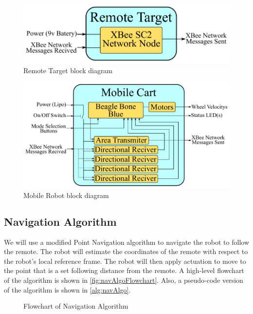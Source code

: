 \documentclass[letterpaper,12pt]{article}   %
\begin{document}
\begin{figure}[!h]
    \centering
    \includegraphics[scale=0.9]{figs/remote_target_block_diagram}
    \caption{Remote Target block diagram}
	\label{fig:remote_block_diag}
\end{figure}
\begin{figure}[!h]
    \centering
    \includegraphics[scale=0.82]{figs/mobile_cart_block_diagram}
    \caption{Mobile Robot block diagram}
	\label{fig:mobile_block_diag}
\end{figure}

\subsection{Navigation Algorithm}
We will use a modified Point Navigation algorithm to navigate the robot to follow the remote. The robot will estimate the coordinates of the remote with respect to the robot's local reference frame. The robot will then apply actuation to move to the point that is a set following distance from the remote. A high-level flowchart of the algorithm is shown in \autoref{fig:navAlgoFlowchart}. Also, a pseudo-code version of the algorithm is shown in \autoref{alg:navAlgo}.

\begin{figure}
  \centering
  
  \caption{Flowchart of Navigation Algorithm}
  \label{fig:navAlgoFlowchart}
\end{figure}
\end{document}
